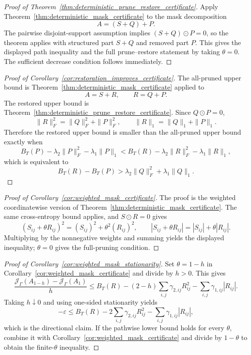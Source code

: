 \documentclass[11pt]{article}
\theoremstyle{plain}
\theoremstyle{definition}
\theoremstyle{remark}
\newcommand{\1}{\mathbf{1}}
\begin{document}
\begin{proof}[Proof of Theorem~\ref{thm:deterministic_prune_restore_certificate}]
Apply Theorem~\ref{thm:deterministic_mask_certificate} to the mask decomposition
\[
A=(S+Q)+P.
\]
The pairwise disjoint-support assumption implies \((S+Q)\odot P=0\), so the theorem applies with structured part \(S+Q\) and removed part \(P\). This gives the displayed path inequality and the full prune--restore statement by taking \(\theta=0\). The sufficient decrease condition follows immediately.
\end{proof}

\begin{proof}[Proof of Corollary~\ref{cor:restoration_improves_certificate}]
The all-pruned upper bound is Theorem~\ref{thm:deterministic_mask_certificate} applied to
\[
A=S+R,
\qquad R=Q+P.
\]
The restored upper bound is Theorem~\ref{thm:deterministic_prune_restore_certificate}. Since \(Q\odot P=0\),
\[
\|R\|_F^2=\|Q\|_F^2+\|P\|_F^2,
\qquad
\|R\|_1=\|Q\|_1+\|P\|_1.
\]
Therefore the restored upper bound is smaller than the all-pruned upper bound exactly when
\[
B_T(P)-\lambda_2\|P\|_F^2-\lambda_1\|P\|_1
<
B_T(R)-\lambda_2\|R\|_F^2-\lambda_1\|R\|_1,
\]
which is equivalent to
\[
B_T(R)-B_T(P)
>
\lambda_2\|Q\|_F^2+\lambda_1\|Q\|_1.
\]
\end{proof}

\begin{proof}[Proof of Corollary~\ref{cor:weighted_mask_certificate}]
The proof is the weighted coordinatewise version of Theorem~\ref{thm:deterministic_mask_certificate}. The same cross-entropy bound applies, and \(S\odot R=0\) gives
\[
(S_{ij}+\theta R_{ij})^2=(S_{ij})^2+\theta^2(R_{ij})^2,
\qquad
|S_{ij}+\theta R_{ij}|=|S_{ij}|+\theta|R_{ij}|.
\]
Multiplying by the nonnegative weights and summing yields the displayed inequality; \(\theta=0\) gives the full-pruning condition.
\end{proof}

\begin{proof}[Proof of Corollary~\ref{cor:weighted_mask_stationarity}]
Set \(\theta=1-h\) in Corollary~\ref{cor:weighted_mask_certificate} and divide by \(h>0\). This gives
\[
\frac{\mathcal J_{\Gamma}(A_{1-h})-\mathcal J_{\Gamma}(A_1)}{h}
\le
B_T(R)
-(2-h)\sum_{i,j}\gamma_{2,ij}R_{ij}^2
-\sum_{i,j}\gamma_{1,ij}|R_{ij}|.
\]
Taking \(h\downarrow0\) and using one-sided stationarity yields
\[
-\varepsilon
\le
B_T(R)
-2\sum_{i,j}\gamma_{2,ij}R_{ij}^2
-\sum_{i,j}\gamma_{1,ij}|R_{ij}|,
\]
which is the directional claim. If the pathwise lower bound holds for every \(\theta\), combine it with Corollary~\ref{cor:weighted_mask_certificate} and divide by \(1-\theta\) to obtain the finite-\(\theta\) inequality.
\end{proof}
\end{document}
